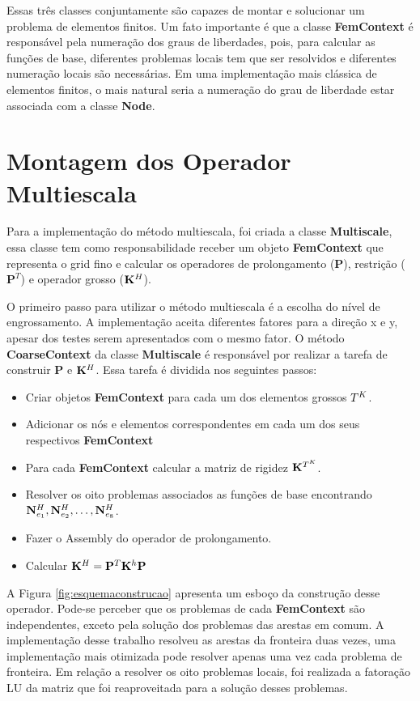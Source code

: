 Essas três classes conjuntamente são capazes de montar e solucionar um problema de elementos finitos. Um fato importante é que a classe \textbf{FemContext} é responsável pela numeração dos graus de liberdades, pois, para calcular as funções de base, diferentes problemas locais tem que ser resolvidos e diferentes numeração locais são necessárias. Em uma implementação mais clássica de elementos finitos, o mais natural seria a numeração do grau de liberdade estar associada com a classe \textbf{Node}.


\section{Montagem dos Operador Multiescala}

Para a implementação do método multiescala, foi criada a classe \textbf{Multiscale}, essa classe tem como responsabilidade receber um objeto \textbf{FemContext} que representa o grid fino e calcular os operadores de prolongamento ($\mathbf{P}$), restrição ($\mathbf{P}^T$) e operador grosso ($\rigidmatrixcoarse$).


O primeiro passo para utilizar o método multiescala é a escolha do nível de engrossamento. A implementação aceita diferentes fatores para a direção x e y, apesar dos testes serem apresentados com o mesmo fator. O método \textbf{CoarseContext} da classe \textbf{Multiscale} é responsável por realizar a tarefa de construir $\mathbf{P}$ e $\rigidmatrixcoarse$. Essa tarefa é dividida nos seguintes passos: 

\begin{itemize}
    \item Criar objetos \textbf{FemContext} para cada um dos elementos grossos $\coarseelement$.
    \item Adicionar os nós e elementos correspondentes em cada um dos seus respectivos \textbf{FemContext}
    \item Para cada \textbf{FemContext} calcular a matriz de rigidez $\rigidmatrixelementms$.
    \item Resolver os oito problemas associados as funções de base encontrando $\basefunctionelemcoarse[1],  \basefunctionelemcoarse[2], \hdots, \basefunctionelemcoarse[8]$.
    \item Fazer o Assembly do operador de prolongamento.
    \item Calcular $\rigidmatrixcoarse = \mathbf{P}^T \rigidmatrix \mathbf{P}$
\end{itemize}

A Figura \ref{fig:esquemaconstrucao} apresenta um esboço da construção desse operador. Pode-se perceber que os problemas de cada \textbf{FemContext} são independentes, exceto pela solução dos problemas das arestas em comum. A implementação desse trabalho resolveu as arestas da fronteira duas vezes, uma implementação mais otimizada pode resolver apenas uma vez cada problema de fronteira. Em relação a resolver os oito problemas locais, foi realizada a fatoração LU da matriz que foi reaproveitada para a solução desses problemas. 

